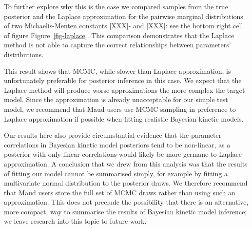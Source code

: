 \documentclass[journal=asbcd6,manuscript=article,layout=traditional]{achemso}
\begin{document}
To further explore why this is the case we compared samples from the
true posterior and the Laplace approximation for the pairwise marginal
distributions of two Michaelis-Menten constants {[}XXX{]}- and
{[}XXX{]}: see the bottom right cell of figure Figure~\ref{fig-laplace}.
This comparison demonstrates that the Laplace method is not able to
capture the correct relationships between parameters' distributions.

This result shows that MCMC, while slower than Laplace approximation, is
unfortunately preferable for posterior inference in this case. We expect
that the Laplace method will produce worse approximations the more
complex the target model. Since the approximation is already
unacceptable for our simple test model, we recommend that Maud users use
MCMC sampling in preference to Laplace approximation if possible when
fitting realistic Bayesian kinetic models.

Our results here also provide circumstantial evidence that the parameter
correlations in Bayesian kinetic model posteriors tend to be non-linear,
as a posterior with only linear correlations would likely be more
germane to Laplace approximation. A conclusion that we drew from this
analysis was that the results of fitting our model cannot be summarised
simply, for example by fitting a multivariate normal distribution to the
posterior draws. We therefore recommend that Maud users store the full
set of MCMC draws rather than using such an approximation. This does not
preclude the possibility that there is an alternative, more compact, way
to summarise the results of Bayesian kinetic model inference; we leave
research into this topic to future work.
\end{document}
